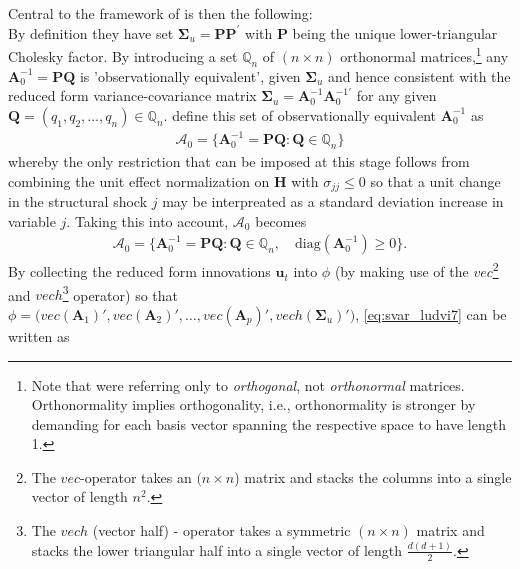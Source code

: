 \documentclass[a4paper,11pt,listof=nochaptergap,oneside,pointednumbers,bibtotoc,bigheadings,liststotoc]{scrbook}
\theoremstyle{mysatz}
\theoremstyle{mydefinition}
\theoremstyle{mybemerkung}
\newcommand{\vect}[1]{\boldsymbol{\mathbf{#1}}}
\begin{document}
\begin{itemize}
Central to the framework of \citet{ludvigsonetal:18} is then the following: \\
By definition they have set $\vect{\Sigma}_u = \vect{P}\vect{P}^'$ with $\vect{P}$ being the unique lower-triangular Cholesky factor. By introducing a set $\mathbb{Q}_n$ of $(n \times n)$ orthonormal matrices,\footnote{Note that \citet{rubioetal:10} were referring only to \textit{orthogonal}, not \textit{orthonormal} matrices. Orthonormality implies orthogonality, i.e., orthonormality is stronger by demanding for each basis vector spanning the respective space to have length 1.} any $\vect{A}_0^{-1} = \vect{P}\vect{Q}$ is 'observationally equivalent', given $\vect{\Sigma}_u$ and hence consistent with the reduced form variance-covariance matrix $\vect{\Sigma}_u = \vect{A}_0^{-1}\vect{A}_0^{-1'}$ for any given $\vect{Q} = (q_1, q_2, \dots, q_n) \in \mathbb{Q}_n$. \citet{ludvigsonetal:18} define this set of observationally equivalent $\vect{A}_0^{-1}$ as 
\begin{equation} \label{eq:svar_ludvi6}
\begin{split}
 			\mathcal{A}_0 = \{\vect{A}_0^{-1} = \vect{P}\vect{Q}: \vect{Q} \in \mathbb{Q}_n\}
\end{split}								
\end{equation}
whereby the only restriction that can be imposed at this stage follows from combining the unit effect normalization on $\vect{H}$ with $\sigma_{jj} \leq 0$ so that a unit change in the structural shock $j$ may be interpreated as a standard deviation increase in variable $j$. Taking this into account, $\mathcal{A}_0$ becomes
\begin{equation} \label{eq:svar_ludvi7}
\begin{split}
 			\vect{\mathcal{A}}_0 = \{\vect{A}_0^{-1} = \vect{P}\vect{Q}: \vect{Q} \in \mathbb{Q}_n, \quad \text{diag}(\vect{A}_0^{-1}) \geq 0\}.
\end{split}								
\end{equation}
By collecting the reduced form innovations $\vect{u}_t$ into $\phi$ (by making use of the $vec$\footnote{The $vec$-operator takes an $(n \times n$) matrix and stacks the columns into a single vector of length $n^2$.} and $vech$\footnote{The $vech$ (vector half) - operator takes a symmetric $(n \times n)$ matrix and stacks the lower triangular half into a single vector of length $\frac{d(d+1)}{2}$.} operator) so that $\phi = \Big(vec(\vect{A}_1)', vec(\vect{A}_2)', \dots, vec(\vect{A}_p)', vech(\vect{\Sigma}_u)'\Big)$, \ref{eq:svar_ludvi7} can be written as 
\begin{equation} \label{eq:svar_ludvi8}

\end{equation}
\end{itemize}
\end{document}
